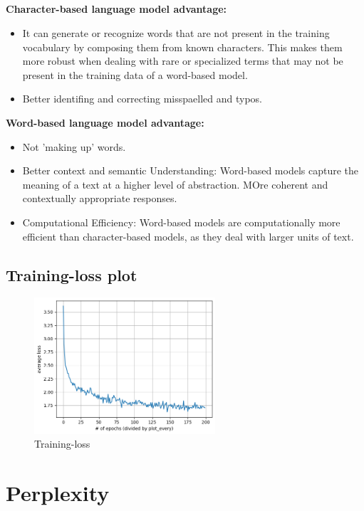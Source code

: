 \documentclass{article}
\begin{document}
\subsection{}
\textbf{Character-based language model advantage:}
\begin{itemize}
    \item It can generate or recognize words that are not present in the training vocabulary by composing them from known characters. This makes them more robust when dealing with rare or specialized terms that may not be present in the training data of a word-based model.
    \item Better identifing and correcting misspaelled and typos.
\end{itemize}
\textbf{Word-based language model advantage:}
\begin{itemize}
    \item Not 'making up' words.
    \item Better context and semantic Understanding: Word-based models capture the meaning of a text at a higher level of abstraction. MOre coherent and contextually appropriate responses.
    \item Computational Efficiency: Word-based models are computationally more efficient than character-based models, as they deal with larger units of text.
\end{itemize}
\subsection{Training-loss plot}
\begin{figure}[h]
\centering
\includegraphics[width=0.6\textwidth]{ims/q3.png}
\caption{Training-loss}
\end{figure}
\section{Perplexity}
\end{document}
